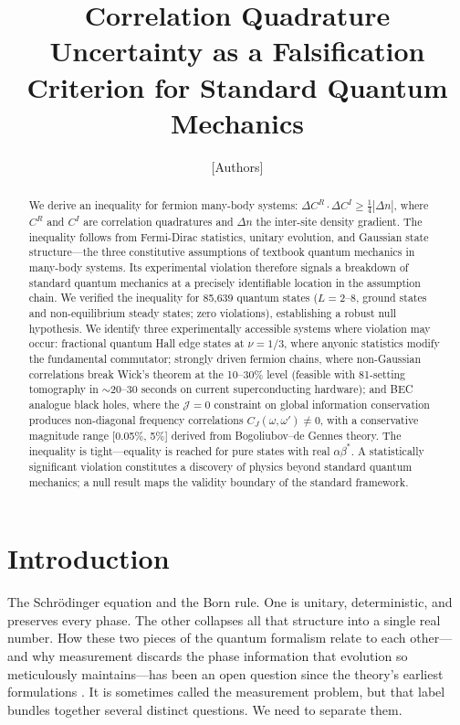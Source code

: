 \documentclass[aps,prd,reprint,superscriptaddress,twocolumn]{revtex4-2}
\begin{document}
\title{Correlation Quadrature Uncertainty as a Falsification Criterion for Standard Quantum Mechanics}

\author{[Authors]}
\email{[email]}
\affiliation{[Institution]}

\begin{abstract}
We derive an inequality for fermion many-body systems: $\Delta C^R \cdot \Delta C^I \geq \frac{1}{4}|\Delta n|$, where $C^R$ and $C^I$ are correlation quadratures and $\Delta n$ the inter-site density gradient. The inequality follows from Fermi-Dirac statistics, unitary evolution, and Gaussian state structure---the three constitutive assumptions of textbook quantum mechanics in many-body systems. Its experimental violation therefore signals a breakdown of standard quantum mechanics at a precisely identifiable location in the assumption chain. We verified the inequality for 85,639 quantum states ($L=2$--$8$, ground states and non-equilibrium steady states; zero violations), establishing a robust null hypothesis. We identify three experimentally accessible systems where violation may occur: fractional quantum Hall edge states at $\nu=1/3$, where anyonic statistics modify the fundamental commutator; strongly driven fermion chains, where non-Gaussian correlations break Wick's theorem at the 10--30\% level (feasible with 81-setting tomography in $\sim$20--30 seconds on current superconducting hardware); and BEC analogue black holes, where the $\mathcal{J}=0$ constraint on global information conservation produces non-diagonal frequency correlations $C_J(\omega,\omega')\neq 0$, with a conservative magnitude range [0.05\%, 5\%] derived from Bogoliubov--de Gennes theory. The inequality is tight---equality is reached for pure states with real $\alpha\beta^*$. A statistically significant violation constitutes a discovery of physics beyond standard quantum mechanics; a null result maps the validity boundary of the standard framework.
\end{abstract}

\maketitle

\section{Introduction}

The Schr\"{o}dinger equation and the Born rule. One is unitary, deterministic, and preserves every phase. The other collapses all that structure into a single real number. How these two pieces of the quantum formalism relate to each other---and why measurement discards the phase information that evolution so meticulously maintains---has been an open question since the theory's earliest formulations \cite{vonNeumann1932,Dirac1930,Bell1987,Schlosshauer2004}. It is sometimes called the measurement problem, but that label bundles together several distinct questions. We need to separate them.
\end{document}
